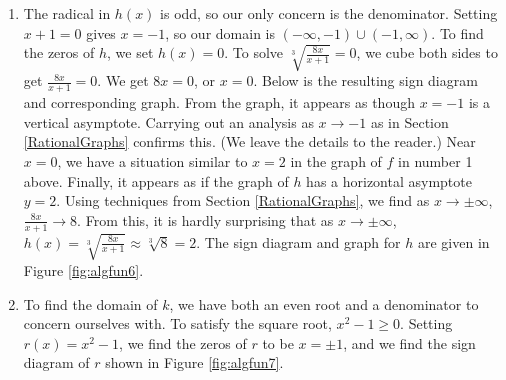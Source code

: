 {\begin{enumerate}
\drawexampleline

\item  The radical in $h(x)$ is odd, so our only concern is the denominator.  Setting $x+1=0$ gives $x=-1$, so our domain is $(-\infty, -1) \cup (-1, \infty)$.  To find the zeros of $h$, we set $h(x) = 0$. 
To solve $\sqrt[3]{\frac{8x}{x+1}} = 0$, we cube both sides to get $\frac{8x}{x+1} = 0$.  We get $8x=0$, or $x=0$. Below is the resulting sign diagram and corresponding graph. From the graph, it appears as though $x=-1$ is a vertical asymptote.  Carrying out an analysis as $x \rightarrow -1$ as in Section \ref{RationalGraphs} confirms this.  (We leave the details to the reader.)  Near $x=0$, we have a situation similar to $x=2$ in the graph of $f$ in number 1 above.  Finally, it appears as if the graph of $h$ has a horizontal asymptote $y=2$.  Using techniques from Section \ref{RationalGraphs}, we find as $x \rightarrow \pm \infty$, $\frac{8x}{x+1} \rightarrow 8$.  From this, it is hardly surprising that as $x \rightarrow \pm \infty$, $h(x) = \sqrt[3]{\frac{8x}{x+1}} \approx  \sqrt[3]{8} =2$. The sign diagram and graph for $h$ are given in Figure \ref{fig:algfun6}.



\item  To find the domain of $k$, we have both an even root and a denominator to concern ourselves with.  To satisfy the square root, $x^2 - 1 \geq 0$.  Setting $r(x) = x^2-1$, we find the zeros of $r$ to be $x = \pm 1$, and we find the sign diagram of $r$ shown in Figure \ref{fig:algfun7}.




\end{enumerate}}
